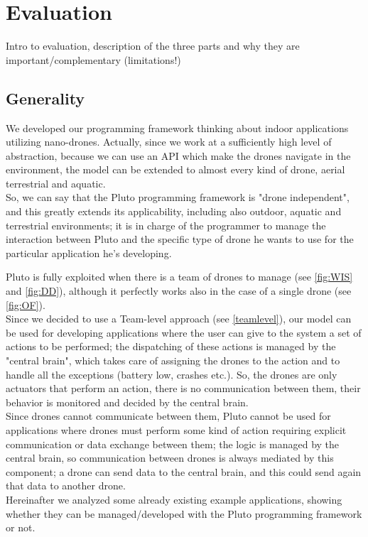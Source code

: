 \chapter{Evaluation}
\label{cap6}

Intro to evaluation, description of the three parts and why they are important/complementary (limitations!)




\section{Generality}\label{applicability}

We developed our programming framework thinking about indoor applications utilizing nano-drones.
Actually, since we work at a sufficiently high level of abstraction, because we can use an API which make the drones navigate in the environment, the model can be extended to almost every kind of drone, aerial terrestrial and aquatic.
\\
So, we can say that the Pluto programming framework is "drone independent", and this greatly extends its applicability, including also outdoor, aquatic and terrestrial environments; it is in charge of the programmer to manage the interaction between Pluto and the specific type of drone he wants to use for the particular application he's developing.

Pluto is fully exploited when there is a team of drones to manage (see \ref{fig:WIS} and \ref{fig:DD}), although it perfectly works also in the case of a single drone (see \ref{fig:OF}).
\\

Since we decided to use a Team-level approach (see \ref{teamlevel}), our model can be used for developing applications where the user can give to the system a set of actions to be performed; the dispatching of these actions is managed by the "central brain", which takes care of assigning the drones to the action and to handle all the exceptions (battery low, crashes etc.). So, the drones are only actuators that perform an action, there is no communication between them, their behavior is monitored and decided by the central brain.
\\

Since drones cannot communicate between them, Pluto cannot be used for applications where drones must perform some kind of action requiring explicit communication or data exchange between them; the logic is managed by the central brain, so communication between drones is always mediated by this component; a drone can send data to the central brain, and this could send again that data to another drone.
\\
Hereinafter we analyzed some already existing example applications, showing whether they can be managed/developed with the Pluto programming framework or not.
\\

